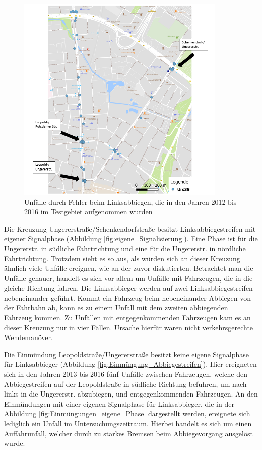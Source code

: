 \begin{savenotes}
	\begin{figure}[H]
		\centering
		\includegraphics[width=10cm,height=10cm]{figures/map_Urs35}
		\caption[Unfälle durch Fehler beim Linksabbiegen, die in den Jahren 2012 bis 2016 im Testgebiet aufgenommen wurden]{Unfälle durch Fehler beim Linksabbiegen, die in den Jahren 2012 bis 2016 im Testgebiet aufgenommen wurden}\label{fig:map_Urs35}
	\end{figure}
\end{savenotes}

Die Kreuzung Ungererstraße/Schenkendorfstraße besitzt Linksabbiegestreifen mit eigener Signalphase (Abbildung  \ref{fig:eigene_Signalisierung}). Eine Phase ist für die Ungererstr. in südliche Fahrtrichtung und eine für die Ungererstr. in nördliche Fahrtrichtung. Trotzdem sieht es so aus, als würden sich an dieser Kreuzung ähnlich viele Unfälle ereignen, wie an der zuvor diskutierten. Betrachtet man die Unfälle genauer, handelt es sich vor allem um Unfälle mit Fahrzeugen, die in die gleiche Richtung fahren. Die Linksabbieger werden auf zwei Linksabbiegestreifen nebeneinander geführt. Kommt ein Fahrzeug beim nebeneinander Abbiegen von der Fahrbahn ab, kann es zu einem Unfall mit dem zweiten abbiegenden Fahrzeug kommen. Zu Unfällen mit entgegenkommenden Fahrzeugen kam es an dieser Kreuzung nur in vier Fällen. Ursache hierfür waren nicht verkehrsgerechte Wendemanöver.

Die Einmündung Leopoldstraße/Ungererstraße besitzt keine eigene Signalphase für Linksabbieger (Abbildung \ref{fig:Einmüngung_Abbiegestreifen}). Hier ereigneten sich in den Jahren 2013 bis 2016 fünf Unfälle zwischen Fahrzeugen, welche den Abbiegestreifen auf der Leopoldstraße in südliche Richtung befuhren, um nach links in die Ungererstr. abzubiegen, und entgegenkommenden Fahrzeugen. An den Einmündungen mit einer eigenen Signalphase für Linksabbieger, die in der Abbildung \ref{fig:Einmüngungen_eigene_Phase} dargestellt werden, ereignete sich lediglich ein Unfall im Untersuchungszeitraum. Hierbei handelt es sich um einen Auffahrunfall, welcher durch zu starkes Bremsen beim Abbiegevorgang ausgelöst wurde.

